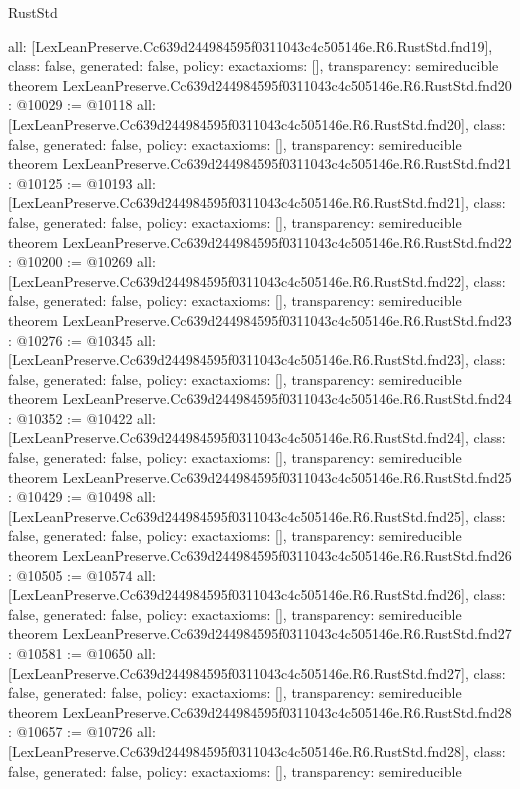 \begin{lexlean}{RustStd}
\begin{coremodule}
{  all: [LexLeanPreserve.Cc639d244984595f0311043c4c505146e.R6.RustStd.fnd19],
  class: false,
  generated: false,
  policy: exact{axioms: []},
  transparency: semireducible
}
theorem LexLeanPreserve.Cc639d244984595f0311043c4c505146e.R6.RustStd.fnd20 : @10029 := @10118 {
  all: [LexLeanPreserve.Cc639d244984595f0311043c4c505146e.R6.RustStd.fnd20],
  class: false,
  generated: false,
  policy: exact{axioms: []},
  transparency: semireducible
}
theorem LexLeanPreserve.Cc639d244984595f0311043c4c505146e.R6.RustStd.fnd21 : @10125 := @10193 {
  all: [LexLeanPreserve.Cc639d244984595f0311043c4c505146e.R6.RustStd.fnd21],
  class: false,
  generated: false,
  policy: exact{axioms: []},
  transparency: semireducible
}
theorem LexLeanPreserve.Cc639d244984595f0311043c4c505146e.R6.RustStd.fnd22 : @10200 := @10269 {
  all: [LexLeanPreserve.Cc639d244984595f0311043c4c505146e.R6.RustStd.fnd22],
  class: false,
  generated: false,
  policy: exact{axioms: []},
  transparency: semireducible
}
theorem LexLeanPreserve.Cc639d244984595f0311043c4c505146e.R6.RustStd.fnd23 : @10276 := @10345 {
  all: [LexLeanPreserve.Cc639d244984595f0311043c4c505146e.R6.RustStd.fnd23],
  class: false,
  generated: false,
  policy: exact{axioms: []},
  transparency: semireducible
}
theorem LexLeanPreserve.Cc639d244984595f0311043c4c505146e.R6.RustStd.fnd24 : @10352 := @10422 {
  all: [LexLeanPreserve.Cc639d244984595f0311043c4c505146e.R6.RustStd.fnd24],
  class: false,
  generated: false,
  policy: exact{axioms: []},
  transparency: semireducible
}
theorem LexLeanPreserve.Cc639d244984595f0311043c4c505146e.R6.RustStd.fnd25 : @10429 := @10498 {
  all: [LexLeanPreserve.Cc639d244984595f0311043c4c505146e.R6.RustStd.fnd25],
  class: false,
  generated: false,
  policy: exact{axioms: []},
  transparency: semireducible
}
theorem LexLeanPreserve.Cc639d244984595f0311043c4c505146e.R6.RustStd.fnd26 : @10505 := @10574 {
  all: [LexLeanPreserve.Cc639d244984595f0311043c4c505146e.R6.RustStd.fnd26],
  class: false,
  generated: false,
  policy: exact{axioms: []},
  transparency: semireducible
}
theorem LexLeanPreserve.Cc639d244984595f0311043c4c505146e.R6.RustStd.fnd27 : @10581 := @10650 {
  all: [LexLeanPreserve.Cc639d244984595f0311043c4c505146e.R6.RustStd.fnd27],
  class: false,
  generated: false,
  policy: exact{axioms: []},
  transparency: semireducible
}
theorem LexLeanPreserve.Cc639d244984595f0311043c4c505146e.R6.RustStd.fnd28 : @10657 := @10726 {
  all: [LexLeanPreserve.Cc639d244984595f0311043c4c505146e.R6.RustStd.fnd28],
  class: false,
  generated: false,
  policy: exact{axioms: []},
  transparency: semireducible
}
\end{coremodule}
\end{lexlean}
